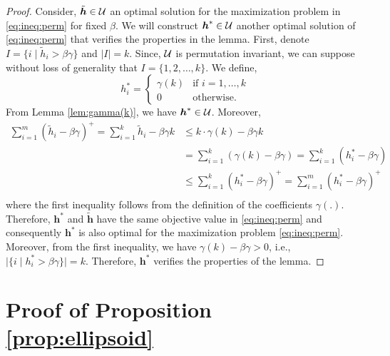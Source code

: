 \documentclass[11pt]{article}
\theoremstyle{plain}
\theoremstyle{definition}
\numberwithin{equation}{section}%
\numberwithin{equation}{section}%
\newcommand{\mb}[1]{\ensuremath{\boldsymbol{#1}}}
\begin{document}
\begin{appendix}
\begin{proof}
Consider, $ \tilde{\mb h} \in {\cal U} $ an optimal solution  for the maximization problem in \eqref{eq:ineq:perm} for fixed $\beta$. We will construct $ \mb h^* \in {\cal U}$ another optimal solution of \eqref{eq:ineq:perm} that verifies the properties in the lemma. First, denote
$ I =   \{ i \; \vert \;  \tilde{h}_i > \beta \gamma\}   $ and  $\vert I\vert =k$. Since, ${\cal U}$ is permutation invariant, we can suppose without loss of generality that $I =\{1,2,\ldots,k \}$. We define,
$$  h^*_i = \left\{
    \begin{array}{ll}
       \gamma(k) & \mbox{if } i=1,\ldots,k \\
        0 & \mbox{otherwise.}
    \end{array}
\right.$$
From Lemma \ref{lem:gamma(k)}, we have $\mb h^* \in {\cal U}$. Moreover,
\begin{align*}
\sum_{i=1}^m ( \tilde{h}_i - \beta \gamma)^+  = \sum_{i=1}^k \tilde{h}_i  - \beta \gamma k  & \leq k  \cdot\gamma(k) - \beta \gamma k \\
& =  \sum_{i=1}^k ( \gamma(k) - \beta \gamma )  =  \sum_{i=1}^k ( h^*_i- \beta \gamma ) \\
& \leq  \sum_{i=1}^k ( h^*_i- \beta \gamma )^+ =  \sum_{i=1}^m ( h^*_i- \beta \gamma )^+\\
\end{align*}
where the first inequality follows from the definition of the coefficients $\gamma (.)$.  Therefore, $\mb{h}^*$ and $ \tilde{\mb h}$ have the same objective value in \eqref{eq:ineq:perm} and consequently $\mb{h}^*$ is also optimal for the maximization problem \eqref{eq:ineq:perm}. Moreover, from the first inequality, we have $ \gamma(k) - \beta \gamma  >0 $, i.e.,  $\big\vert  \{ i \; \vert \;  h_i^* > \beta \gamma\}    \big\vert  =k.$ Therefore, $\mb{h}^*$ verifies the properties of the lemma.
 \end{proof}



\section{Proof of Proposition \ref{prop:ellipsoid}}\label{apx-proofs:prop:ellipsoid}


\end{appendix}
\end{document}
